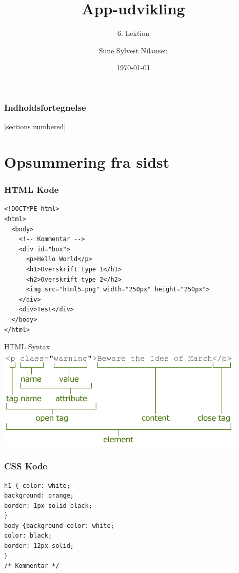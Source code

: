 \documentclass[10pt]{beamer}
\title{App-udvikling}
\subtitle{6. Lektion}
\date{\today}
\author{Sune Sylvest Nilausen}
\begin{document}

\maketitle

\begin{frame}
  \frametitle{Indholdsfortegnelse}
  [sections numbered]
  \tableofcontents[hideallsubsections]
\end{frame}

\section{Opsummering fra sidst}

\begin{frame}[fragile]
 \frametitle{HTML Kode}

\begin{lstlisting}
<!DOCTYPE html>
<html>
  <body>
    <!-- Kommentar -->
    <div id="box">
      <p>Hello World</p>
      <h1>Overskrift type 1</h1>
      <h2>Overskrift type 2</h2>
      <img src="html5.png" width="250px" height="250px">
    </div>
    <div>Test</div>
  </body>
</html>
\end{lstlisting}
\end{frame}

\begin{frame}{HTML Syntax}
		\includegraphics[width=\linewidth]{img/html-syntax.png}
\end{frame}


\begin{frame}[fragile]
 \frametitle{CSS Kode}

\begin{lstlisting}
h1 { color: white;
background: orange;
border: 1px solid black;
}
body {background-color: white;
color: black;
border: 12px solid;
}
/* Kommentar */
\end{lstlisting}
\end{frame}
\end{document}
